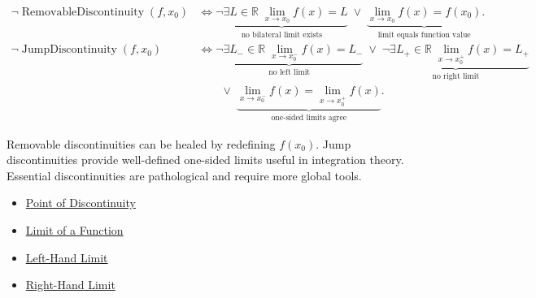 \begin{remark*}
\[
\begin{aligned}
\neg \operatorname{RemovableDiscontinuity}(f,x_0) &\Longleftrightarrow
\underbrace{\neg \exists L \in \mathbb{R}\; \lim_{x \to x_0} f(x) = L}_{\text{no bilateral limit exists}}
\;\lor\;
\underbrace{\lim_{x \to x_0} f(x) = f(x_0)}_{\text{limit equals function value}}.\\
\neg \operatorname{JumpDiscontinuity}(f,x_0) &\Longleftrightarrow
\underbrace{\neg \exists L_{-} \in \mathbb{R}\; \lim_{x \to x_0^-} f(x) = L_{-}}_{\text{no left limit}}
\;\lor\;
\underbrace{\neg \exists L_{+} \in \mathbb{R}\; \lim_{x \to x_0^+} f(x) = L_{+}}_{\text{no right limit}}\\
&\qquad\lor\;
\underbrace{\lim_{x \to x_0^-} f(x) = \lim_{x \to x_0^+} f(x)}_{\text{one-sided limits agree}}.
\end{aligned}
\]
\end{remark*}

\begin{remark*}[Interpretation]
Removable discontinuities can be healed by redefining $f(x_0)$. Jump discontinuities provide well-defined one-sided limits useful in integration theory. Essential discontinuities are pathological and require more global tools.
\end{remark*}

\begin{remark*}[Dependencies]
\begin{itemize}
  \item \hyperref[def:point-of-discontinuity]{Point of Discontinuity}
  \item \hyperref[def:limit-function]{Limit of a Function}
  \item \hyperref[def:left-hand-limit]{Left-Hand Limit}
  \item \hyperref[def:right-hand-limit]{Right-Hand Limit}
\end{itemize}
\end{remark*}
